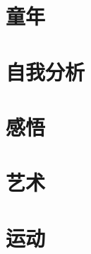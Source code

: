 \documentclass[10pt]{ctexbook}
\begin{document}

\frontmatter

\tableofcontents
\mainmatter

\part{童年}


\part{自我分析}


\part{感悟}





\part{艺术}


\part{运动}





\backmatter
\end{document}
